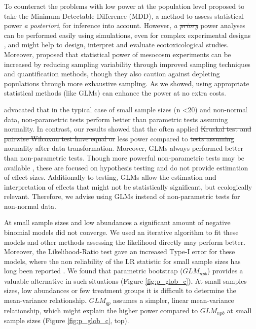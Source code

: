 \documentclass[twocolumn, natbib]{svjour3}
\providecommand{\DIFadd}[1]{{\protect\color{blue}\uwave{#1}}} %
\providecommand{\DIFdel}[1]{{\protect\color{red}\sout{#1}}}                      %
\providecommand{\DIFaddbegin}{} %
\providecommand{\DIFaddend}{} %
\providecommand{\DIFdelbegin}{} %
\providecommand{\DIFdelend}{} %
\begin{document}
To counteract the problems with low power at the population level \citet{brock_minimum_2015} proposed to take the Minimum Detectable Difference (MDD), a method to assess statistical power \emph{a posteriori}, for inference into account.
However, \emph{a \DIFdelbegin \DIFdel{priory}\DIFdelend \DIFaddbegin \DIFadd{priori}\DIFaddend } power analyses can be performed easily using simulations, even for complex experimental designs \citep{johnson_power_2014}, and might help to design, interpret and evaluate ecotoxicological studies.
Moreover, \citet{brock_minimum_2015} proposed that statistical power of mesocosm experiments can be increased by reducing sampling variability through improved sampling techniques and quantification methods, though they also caution against depleting populations through more exhaustive sampling.
As we showed, using appropriate statistical methods (like GLMs) can enhance the power at no extra costs.

\citet{wang_making_2011} advocated that in the typical case of small sample sizes (n \textless 20) and non-normal data, non-parametric tests perform better than parametric tests assuming normality.
In contrast, our results showed that the often applied \DIFdelbegin \DIFdel{Kruskal test and pairwise Wilcoxon test have equal or }\DIFdelend \DIFaddbegin \DIFadd{$KW$ and $WT$ have }\DIFaddend less power compared to \DIFdelbegin \DIFdel{tests assuming normality after data transformation}\DIFdelend \DIFaddbegin \DIFadd{$LM$}\DIFaddend .
Moreover, \DIFdelbegin \DIFdel{GLMs }\DIFdelend \DIFaddbegin \DIFadd{$GLMs$ }\DIFaddend always performed better than non-parametric tests. 
Though more powerful non-parametric tests may be available \citep{konietschke_rank-based_2012}, these are focused on hypothesis testing and do not provide estimation of effect sizes.
Additionally to testing, GLMs allow the estimation and interpretation of effects that might not be statistically significant, but ecologically relevant.
Therefore, we advise using GLMs instead of non-parametric tests for non-normal data.

At small sample sizes and low abundances a significant amount of negative binomial models did not converge.
We used an iterative algorithm to fit these models \citep{venables_modern_2002} and other methods assessing the likelihood directly may perform better.
Moreover, the Likelihood-Ratio test gave an increased Type-I error for these models, where the non reliability of the LR statistic for small sample sizes has long been reported \citep{bolker_generalized_2009,wilks_large-sample_1938}. 
We found that parametric bootstrap ($GLM_{npb}$) provides a valuable alternative in such situations (Figure \ref{fig:p_glob_c}).
At small samples sizes, low abundances or few treatment groups it is difficult to determine the mean-variance relationship.
$GLM_{qp}$ assumes a simpler, linear mean-variance relationship, which might explain the higher power compared to $GLM_{npb}$ at small sample sizes (Figure \ref{fig:p_glob_c}, top).
\end{document}
